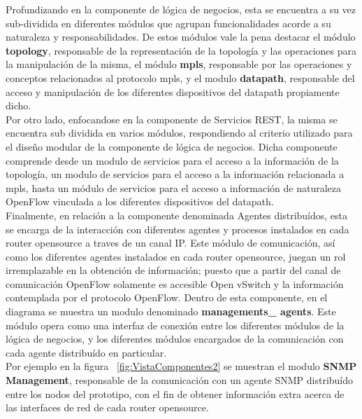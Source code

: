 Profundizando en la componente de l\'ogica de negocios, esta se encuentra a su vez sub-dividida en diferentes m\'odulos que agrupan funcionalidades acorde a su naturaleza y responsabilidades. De estos m\'odulos vale la pena destacar el m\'odulo \textbf{topology}, responsable de la representaci\'on de la topolog\'ia y las operaciones para la manipulaci\'on de la misma, el m\'odulo \textbf{mpls}, responsable por las operaciones y conceptos relacionados al protocolo mpls, y el modulo \textbf{datapath}, responsable del acceso y manipulaci\'on de los diferentes dispositivos del datapath propiamente dicho.\\ 

Por otro lado, enfocandose en la componente de Servicios REST, la misma se encuentra sub dividida en varios m\'odulos, respondiendo al criterio utilizado para el dise\~no modular de la componente de l\'ogica de negocios. Dicha componente comprende desde un modulo de servicios para el acceso a la informaci\'on de la topolog\'ia, un modulo de servicios para el acceso a la informaci\'on relacionada a mpls, hasta un m\'odulo de servicios para el acceso a informaci\'on de naturaleza OpenFlow vinculada a los diferentes dispositivos del datapath.\\

Finalmente, en relaci\'on a la componente denominada Agentes distribu\'idos, esta se encarga de la interacci\'on con diferentes agentes y procesos instalados en cada router opensource a traves de un canal IP. Este m\'odulo de comunicaci\'on, as\'i como los diferentes agentes instalados en cada router opensource, juegan un rol irremplazable en la obtenci\'on de informaci\'on; puesto que a partir del canal de comunicaci\'on OpenFlow solamente es accesible Open vSwitch y la informaci\'on contemplada por el protocolo OpenFlow.
Dentro de esta componente, en el diagrama se muestra un modulo denominado \textbf{managements\_ agents}. Este m\'odulo opera como una interfaz de conexi\'on entre los diferentes m\'odulos de la l\'ogica de negocios, y los diferentes m\'odulos encargados de la comunicaci\'on con cada agente distribu\'ido en particular.\\ 

Por ejemplo en la figura ~\ref{fig:VistaComponentes2} se muestran el modulo \textbf{SNMP Management}, responsable de  la comunicaci\'on con un agente SNMP distribu\'ido entre los nodos del prototipo, con el fin de obtener informaci\'on extra acerca de las interfaces de red de cada router opensource.\\

